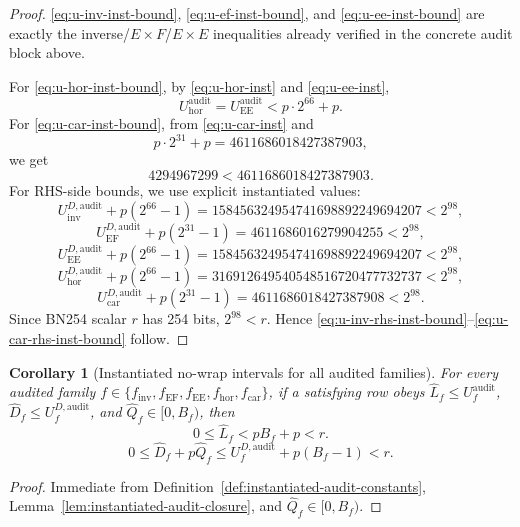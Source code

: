 ﻿\documentclass[11pt]{article}
\newtheorem{corollary}[theorem]{Corollary}
\newcommand{\wt}[1]{\widehat{#1}}
\begin{document}
\begin{proof}
\eqref{eq:u-inv-inst-bound}, \eqref{eq:u-ef-inst-bound}, and
\eqref{eq:u-ee-inst-bound} are exactly the inverse/\(E\times F\)/\(E\times E\)
inequalities already verified in the concrete audit block above.

For \eqref{eq:u-hor-inst-bound}, by \eqref{eq:u-hor-inst} and
\eqref{eq:u-ee-inst},
\[
U_{\mathrm{hor}}^{\mathrm{audit}}
=
U_{\mathrm{EE}}^{\mathrm{audit}}
<
p\cdot 2^{66}+p.
\]
For \eqref{eq:u-car-inst-bound}, from \eqref{eq:u-car-inst} and
\[
p\cdot 2^{31}+p
=
4611686018427387903,
\]
we get
\[
4294967299 < 4611686018427387903.
\]
For RHS-side bounds, we use explicit instantiated values:
\[
U_{\mathrm{inv}}^{D,\mathrm{audit}} + p(2^{66}-1)
=
158456324954741698892249694207
<
2^{98},
\]
\[
U_{\mathrm{EF}}^{D,\mathrm{audit}} + p(2^{31}-1)
=
4611686016279904255
<
2^{98},
\]
\[
U_{\mathrm{EE}}^{D,\mathrm{audit}} + p(2^{66}-1)
=
158456324954741698892249694207
<
2^{98},
\]
\[
U_{\mathrm{hor}}^{D,\mathrm{audit}} + p(2^{66}-1)
=
316912649540548516720477732737
<
2^{98},
\]
\[
U_{\mathrm{car}}^{D,\mathrm{audit}} + p(2^{31}-1)
=
4611686018427387908
<
2^{98}.
\]
Since BN254 scalar \(r\) has 254 bits, \(2^{98}<r\). Hence
\eqref{eq:u-inv-rhs-inst-bound}--\eqref{eq:u-car-rhs-inst-bound} follow.
\end{proof}

\begin{corollary}[Instantiated no-wrap intervals for all audited families]
\label{cor:instantiated-no-wrap-intervals}
For every audited family
\(f\in\{f_{\mathrm{inv}},f_{\mathrm{EF}},f_{\mathrm{EE}},f_{\mathrm{hor}},f_{\mathrm{car}}\}\),
if a satisfying row obeys
\(\wt{L}_f\le U_f^{\mathrm{audit}}\),
\(\wt{D}_f\le U_f^{D,\mathrm{audit}}\), and \(\wt{Q}_f\in[0,B_f)\), then
\[
0\le \wt{L}_f < pB_f+p < r.
\]
\[
0\le \wt{D}_f + p\wt{Q}_f
\le
U_f^{D,\mathrm{audit}} + p(B_f-1)
< r.
\]
\end{corollary}

\begin{proof}
Immediate from Definition~\ref{def:instantiated-audit-constants},
Lemma~\ref{lem:instantiated-audit-closure}, and \(\wt{Q}_f\in[0,B_f)\).
\end{proof}
\end{document}
